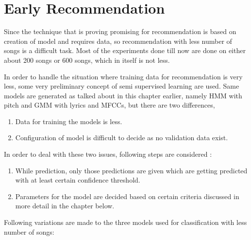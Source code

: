 \section{Early Recommendation}
\label{early}
Since the technique that is proving promising for recommendation is based on creation of model and requires data, so recommendation with less number of songs is a difficult task. Most of the experiments done till now are done on either about 200 songs or 600 songs, which in itself is not less. \par
In order to handle the situation where training data for recommendation is very less, some very preliminary concept of semi supervised learning are used. Same models are generated as talked about in this chapter earlier, namely HMM with pitch and GMM with lyrics and MFCCs, but there are two differences,
\begin{enumerate}
\item Data for training the models is less.
\item Configuration of model is difficult to decide as no validation data exist.
\end{enumerate}
In order to deal with these two issues, following steps are considered :
\begin{enumerate}
\item While prediction, only those predictions are given which are getting predicted with at least certain confidence threshold.
\item Parameters for the model are decided based on certain criteria discussed in more detail in the chapter below.
\end{enumerate}
Following variations are made to the three models used for classification with less number of songs:
